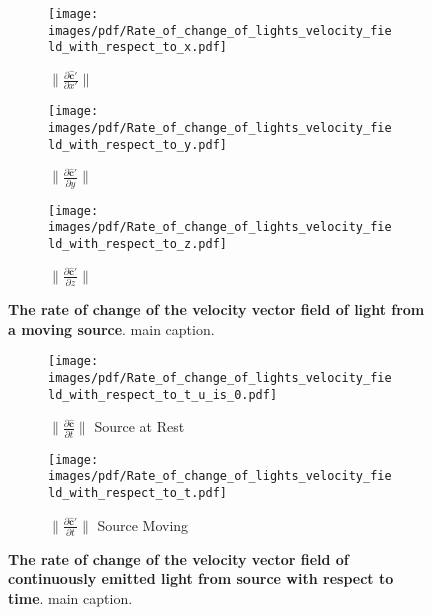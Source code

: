 \begin{figure}[H]
	\centering
	\begin{subfigure}{0.32\textwidth}
		\centering
		\texttt{[image: images/pdf/Rate\_of\_change\_of\_lights\_velocity\_field\_with\_respect\_to\_x.pdf]}
		\caption{$\|\frac{\partial \mathbf{\hat{c}}'}{\partial x'}\|$}
		\label{fig: Rate of change of lights velocity field subfig_1}
	\end{subfigure}
	\begin{subfigure}{0.32\textwidth}
		\centering
		\texttt{[image: images/pdf/Rate\_of\_change\_of\_lights\_velocity\_field\_with\_respect\_to\_y.pdf]}
		\caption{$\|\frac{\partial \mathbf{\hat{c}}'}{\partial y}\|$}
		\label{fig: Rate of change of lights velocity field subfig_2}
	\end{subfigure}
	\begin{subfigure}{0.32\textwidth}
		\centering
		\texttt{[image: images/pdf/Rate\_of\_change\_of\_lights\_velocity\_field\_with\_respect\_to\_z.pdf]}
		\caption{$\|\frac{\partial \mathbf{\hat{c}}'}{\partial z}\|$}
		\label{fig: Rate of change of lights velocity field subfig_3}
	\end{subfigure}
	\caption{\textbf{The rate of change of the velocity vector field of light from a moving source}. main caption.}
	\label{fig: Rate of change of lights velocity field}
\end{figure}

\begin{figure}[H]
	\centering
	\begin{subfigure}{0.45\textwidth}
		\centering
		\texttt{[image: images/pdf/Rate\_of\_change\_of\_lights\_velocity\_field\_with\_respect\_to\_t\_u\_is\_0.pdf]}
		\caption{$\|\frac{\partial \mathbf{\hat{c}}}{\partial t}\|$ Source at Rest}
		\label{fig: Rate of change of lights velocity field with respect to time subfig_1}
	\end{subfigure}
	\begin{subfigure}{0.45\textwidth}
		\centering
		\texttt{[image: images/pdf/Rate\_of\_change\_of\_lights\_velocity\_field\_with\_respect\_to\_t.pdf]}
		\caption{$\|\frac{\partial \mathbf{\hat{c}}'}{\partial t}\|$ Source Moving}
		\label{fig: Rate of change of lights velocity field with respect to time subfig_2}
	\end{subfigure}
	\caption{\textbf{The rate of change of the velocity vector field of continuously emitted light from source with respect to time}. main caption.}
	\label{fig: Rate of change of lights velocity field with respect to time}
\end{figure}

